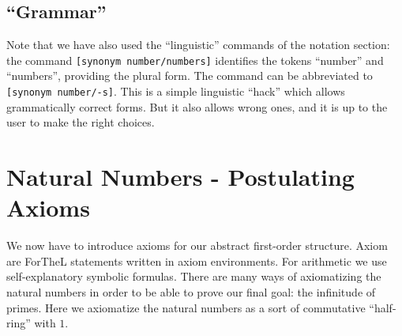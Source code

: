 \documentclass[11pt]{article}
\begin{document}
\subsection{``Grammar''}

Note that we have also used the ``linguistic'' commands of the 
notation section: the command \verb+[synonym number/numbers]+ 
identifies the tokens ``number'' and ``numbers'', providing the
plural form. The command can be abbreviated to
\verb+[synonym number/-s]+. This is a simple linguistic
``hack'' which allows grammatically correct forms. But it
also allows wrong ones, and it is up to the user to make the right
choices. 

\section{Natural Numbers - Postulating Axioms}

We now have to introduce axioms for our abstract first-order structure.
Axiom are ForTheL statements written in axiom environments.
For arithmetic we use self-explanatory symbolic formulas.
There are many ways of axiomatizing the natural numbers in order
to be able to prove our final goal: the infinitude of
primes. Here we axiomatize the natural numbers as
a sort of commutative ``half-ring'' with $1$.
\end{document}
